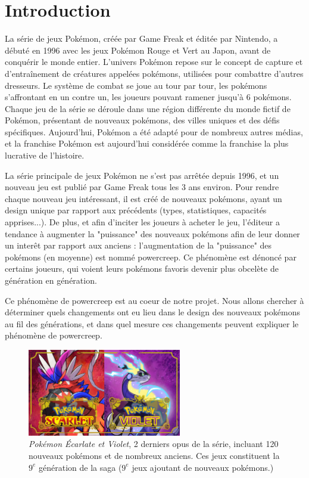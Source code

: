 \documentclass[a4paper,12pt]{article}
\begin{document}
\section{Introduction}
La série de jeux Pokémon, créée par Game Freak et éditée par Nintendo, a débuté
en 1996 avec les jeux Pokémon Rouge et Vert au Japon, avant de conquérir le
monde entier. L'univers Pokémon repose sur le concept de capture et
d'entraînement de créatures appelées pokémons, utilisées pour combattre d'autres
dresseurs. Le système de combat se joue au tour par tour, les pokémons
s'affrontant en un contre un, les joueurs pouvant ramener jusqu'à 6 pokémons.
Chaque jeu de la série se déroule dans une région différente du monde fictif de
Pokémon, présentant de nouveaux pokémons, des villes uniques et des défis
spécifiques. Aujourd'hui, Pokémon a été adapté pour de nombreux autres médias,
et la franchise Pokémon est aujourd'hui considérée comme la franchise la plus
lucrative de l'histoire.

La série principale de jeux Pokémon ne s'est pas arrêtée depuis 1996, et un
nouveau jeu est publié par Game Freak tous les 3 ans environ. Pour rendre chaque
nouveau jeu intéressant, il est créé de nouveaux pokémons, ayant un design
unique par rapport aux précédents (types, statistiques, capacités apprises...).
De plus, et afin d'inciter les joueurs à acheter le jeu, l'éditeur a tendance à
augmenter la "puissance" des nouveaux pokémons afin de leur donner un interêt
par rapport aux anciens : l'augmentation de la "puissance" des pokémons (en
moyenne) est nommé powercreep. Ce phénomène est dénoncé par certains joueurs,
qui voient leurs pokémons favoris devenir plus obcelète de génération en
génération. 

Ce phénomène de powercreep est au coeur de notre projet. Nous allons chercher à
déterminer quels changements ont eu lieu dans le design des nouveaux pokémons au
fil des générations, et dans quel mesure ces changements peuvent expliquer le
phénomène de powercreep.

\begin{figure}[!h]
    \centering
    \includegraphics[width=0.6\textwidth]{Image/scarlet-violet.jpg}
    \caption{\textit{Pokémon Écarlate et Violet}, 2 derniers opus de la série,
    incluant 120 nouveaux pokémons et de nombreux anciens. Ces jeux constituent
    la $9^{e}$ génération de la saga ($9^{e}$  jeux ajoutant de nouveaux
    pokémons.)}
    \label{fig:image1}
\end{figure}
\end{document}
